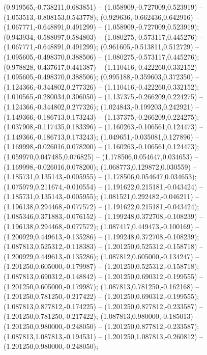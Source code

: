  (0.919565,-0.738211,0.683851) -- (1.058909,-0.727009,0.523919) -- (1.053513,-0.808153,0.543778);
 (0.929636,-0.662436,0.642916) -- (1.067771,-0.648891,0.491299) -- (1.058909,-0.727009,0.523919);
 (0.943934,-0.588097,0.584803) -- (1.080275,-0.573117,0.445276) -- (1.067771,-0.648891,0.491299);
 (0.961605,-0.513811,0.512729) -- (1.095605,-0.498370,0.388506) -- (1.080275,-0.573117,0.445276);
 (0.978828,-0.437617,0.441387) -- (1.110416,-0.422260,0.332152) -- (1.095605,-0.498370,0.388506);
 (0.995188,-0.359603,0.372350) -- (1.124366,-0.344802,0.277326) -- (1.110416,-0.422260,0.332152);
 (1.010565,-0.280034,0.306050) -- (1.137375,-0.266209,0.224275) -- (1.124366,-0.344802,0.277326);
 (1.024843,-0.199203,0.242921) -- (1.149366,-0.186713,0.173243) -- (1.137375,-0.266209,0.224275);
 (1.037908,-0.117435,0.183396) -- (1.160263,-0.106561,0.124473) -- (1.149366,-0.186713,0.173243);
 (1.049651,-0.035081,0.127896) -- (1.169998,-0.026016,0.078200) -- (1.160263,-0.106561,0.124473);
 (1.059970,0.047485,0.076825) -- (1.178506,0.054647,0.034653) -- (1.169998,-0.026016,0.078200);
 (1.068773,0.129872,0.030559) -- (1.185731,0.135143,-0.005955) -- (1.178506,0.054647,0.034653);
 (1.075979,0.211674,-0.010554) -- (1.191622,0.215181,-0.043424) -- (1.185731,0.135143,-0.005955);
 (1.081521,0.292482,-0.046211) -- (1.196138,0.294468,-0.077572) -- (1.191622,0.215181,-0.043424);
 (1.085346,0.371883,-0.076152) -- (1.199248,0.372708,-0.108239) -- (1.196138,0.294468,-0.077572);
 (1.087417,0.449473,-0.100169) -- (1.200929,0.449613,-0.135286) -- (1.199248,0.372708,-0.108239);
 (1.087813,0.525312,-0.118383) -- (1.201250,0.525312,-0.158718) -- (1.200929,0.449613,-0.135286);
 (1.087812,0.605000,-0.134247) -- (1.201250,0.605000,-0.179987) -- (1.201250,0.525312,-0.158718);
 (1.087813,0.690312,-0.148842) -- (1.201250,0.690312,-0.199555) -- (1.201250,0.605000,-0.179987);
 (1.087813,0.781250,-0.162168) -- (1.201250,0.781250,-0.217422) -- (1.201250,0.690312,-0.199555);
 (1.087813,0.877812,-0.174225) -- (1.201250,0.877812,-0.233587) -- (1.201250,0.781250,-0.217422);
 (1.087813,0.980000,-0.185013) -- (1.201250,0.980000,-0.248050) -- (1.201250,0.877812,-0.233587);
 (1.087813,1.087813,-0.194531) -- (1.201250,1.087813,-0.260812) -- (1.201250,0.980000,-0.248050);

